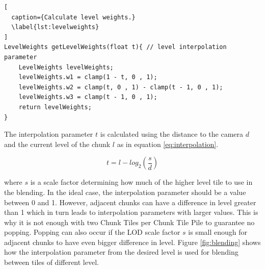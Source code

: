 \begin{lstlisting}[
  caption={Calculate level weights.} 
  \label{lst:levelweights}
]
LevelWeights getLevelWeights(float t){ // level interpolation parameter
	LevelWeights levelWeights;
	levelWeights.w1 = clamp(1 - t, 0 , 1);
	levelWeights.w2 = clamp(t, 0 , 1) - clamp(t - 1, 0 , 1);
	levelWeights.w3 = clamp(t - 1, 0 , 1);
	return levelWeights;
}
\end{lstlisting}

The interpolation parameter $t$ is calculated using the distance to the camera $d$ and the current level of the chunk $l$ as in equation \ref{eq:interpolation}.

\begin{equation}
\label{eq:interpolation}
t = l-log_2(\frac{s}{d})
\end{equation}

where $s$ is a scale factor determining how much of the higher level tile to use in the blending. In the ideal case, the interpolation parameter should be a value between 0 and 1. However, adjacent chunks can have a difference in level greater than 1 which in turn leads to interpolation parameters with larger values. This is why it is not enough with two Chunk Tiles per Chunk Tile Pile to guarantee no popping. Popping can also occur if the LOD scale factor $s$ is small enough for adjacent chunks to have even bigger difference in level. Figure \ref{fig:blending} shows how the interpolation parameter from the desired level is used for blending between tiles of different level.

